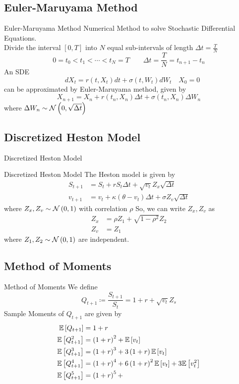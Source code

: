 \subsection{Euler-Maruyama Method}
\begin{frame}{Euler-Maruyama Method}
	Numerical Method to solve Stochastic Differential Equations. \\
	Divide the interval \([0, T]\) into \( N \) equal sub-intervals
	of length \( \Delta t = \frac{T}{N} \)
	\[
		0 = t_0 < t_1 < \cdots < t_N = T
		\quad \quad \Delta t = \frac{T}{N} = t_{n+1} - t_n
	\]
	An SDE
	\[ \quad dX_t = r(t, X_t)dt + \sigma(t, W_t) dW_t \quad X_0 = 0 \]
	can be approximated by Euler-Maruyama method, given by
	\[ X_{n+1} = X_n + r(t_n, X_n) \Delta t + \sigma(t_n, X_n) \Delta W_n \]
	where \( \Delta W_n \sim \mathcal{N}\left( 0, \sqrt{\Delta t} \right) \)
\end{frame}

\subsection{Discretized Heston Model}
\begin{frame}{Discretized Heston Model}
	\begin{block}{Discretized Heston Model}
		The Heston model is given by
		\begin{align*}
			S_{t+1} &= S_t + rS_t \Delta t + \sqrt{v_t} Z_x \sqrt{\Delta t} \\
			v_{t+1} &= v_t + \kappa(\theta - v_t) \Delta t
				+ \sigma Z_v \sqrt{\Delta t}
		\end{align*}
		where \( Z_x, Z_v \sim \mathcal{N}\left( 0, 1 \right) \)
		with correlation \( \rho \)
		So, we can write \( Z_x, Z_v \) as
		\begin{align*}
			Z_x &= \rho Z_1 + \sqrt{1 - \rho^2} Z_2 \\
			Z_v &= Z_1
		\end{align*}
		where \( Z_1, Z_2 \sim \mathcal{N}\left( 0, 1 \right) \) are independent.
	\end{block}
\end{frame}


\subsection{Method of Moments}
\begin{frame}{Method of Moments}
	We define
	\[ Q_{t+1} \coloneqq \frac{S_{t+1}}{S_t} = 1 + r + \sqrt{v_t} Z_s \]
	Sample Moments of \( Q_{t+1} \) are given by
	\begin{align*}
		\mathbb{E} \left[ Q_{t+1} \right] &= 1 + r \\
		\mathbb{E} \left[ Q_{t+1}^2 \right] &= \left( 1+r \right)^2 + \mathbb{E} \left[ v_t \right] \\
		\mathbb{E} \left[ Q_{t+1}^3 \right] &= \left( 1+r \right)^3 + 3\left( 1+r \right)\mathbb{E} \left[ v_t \right] \\
		\mathbb{E} \left[ Q_{t+1}^4 \right] &= \left( 1+r \right)^4 +
			6\left( 1+r \right)^2 \mathbb{E} \left[ v_t \right] + 3\mathbb{E} \left[ v_t^2 \right] \\
		\mathbb{E} \left[ Q_{t+1}^5 \right] &= \left( 1+r \right)^5 +
	\end{align*}
\end{frame}
